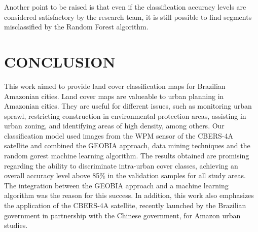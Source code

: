 \documentclass[preprint, 3p,
authoryear]{elsarticle} %
\begin{document}
Another point to be raised is that even if the classification accuracy
levels are considered satisfactory by the research team, it is still
possible to find segments misclassified by the Random Forest algorithm.

\hypertarget{conclusion}{%
\section{CONCLUSION}\label{conclusion}}

This work aimed to provide land cover classification maps for Brazilian
Amazonian cities. Land cover maps are valueable to urban planning in
Amazonian cities. They are useful for different issues, such as
monitoring urban sprawl, restricting construction in environmental
protection areas, assisting in urban zoning, and identifying areas of
high density, among others. Our classification model used images from
the WPM sensor of the CBERS-4A satellite and combined the GEOBIA
approach, data mining techniques and the random gorest machine learning
algorithm. The results obtained are promising regarding the ability to
discriminate intra-urban cover classes, achieving an overall accuracy
level above 85\% in the validation samples for all study areas. The
integration between the GEOBIA approach and a machine learning algorithm
was the reason for this success. In addition, this work also emphasizes
the application of the CBERS-4A satellite, recently launched by the
Brazilian government in partnership with the Chinese government, for
Amazon urban studies.


\end{document}
